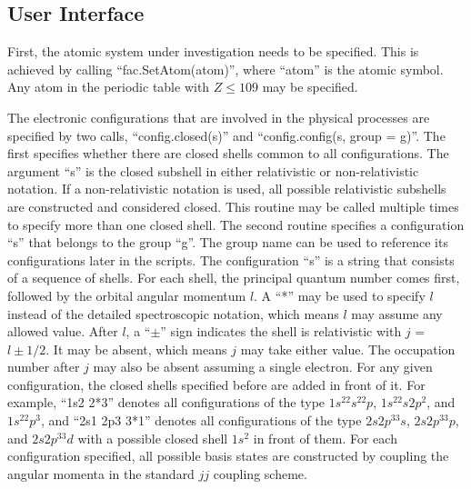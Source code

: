 \documentclass{elsart}
\begin{document}
\subsection{User Interface}
First, the atomic system under investigation needs to be specified. This is
achieved by calling ``fac.SetAtom(atom)'', where ``atom'' is the atomic
symbol. Any atom in the periodic table with $Z \le 109$ may be specified. 

The electronic configurations that are involved in the physical processes are
specified by two calls, ``config.closed(s)'' and ``config.config(s, group =
g)''. The first specifies whether there are closed shells common to all
configurations. The argument ``s'' is the closed subshell in either
relativistic or non-relativistic notation. If a non-relativistic notation is
used, all possible relativistic subshells are constructed and considered
closed. This routine may be called multiple times to specify more than one
closed shell. The second routine specifies a configuration ``s'' that belongs
to the group ``g''. The group name can be used to reference its configurations
later in the scripts. The configuration ``s'' is a string that consists of a
sequence of shells. For each shell, the principal quantum 
number comes first, followed by the orbital angular momentum $l$. A ``*'' may
be used to specify $l$ instead of the detailed spectroscopic notation, which
means $l$ may assume any allowed value. After $l$,  a ``$\pm$'' sign
indicates the shell is relativistic with $j$ = $l\pm 1/2$. It may be absent,
which means $j$ may take either value. The occupation number after $j$ may
also be absent assuming a single electron. For any given configuration, the
closed shells specified before are added in front of it. For example, ``1s2
2*3'' denotes all configurations of the type $1s^22s^22p$, $1s^22s2p^2$, and
$1s^22p^3$, and ``2s1 2p3 3*1'' denotes all configurations of the type
$2s2p^33s$, $2s2p^33p$, and $2s2p^33d$ with a possible closed shell $1s^2$ in
front of them. For each configuration specified, all possible basis states
are constructed by coupling the angular momenta in the standard $jj$ coupling
scheme. 
\end{document}
